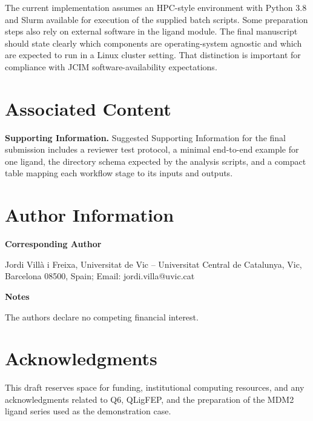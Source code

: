 \documentclass[journal=jcisd8,manuscript=article]{achemso}
\begin{document}
The current implementation assumes an HPC-style environment with Python 3.8 and Slurm available for execution of the supplied batch scripts. Some preparation steps also rely on external software in the ligand module. The final manuscript should state clearly which components are operating-system agnostic and which are expected to run in a Linux cluster setting. That distinction is important for compliance with JCIM software-availability expectations.

\section{Associated Content}

\textbf{Supporting Information.} Suggested Supporting Information for the final submission includes a reviewer test protocol, a minimal end-to-end example for one ligand, the directory schema expected by the analysis scripts, and a compact table mapping each workflow stage to its inputs and outputs.

\section{Author Information}

\textbf{Corresponding Author}

Jordi Vill\`a i Freixa, Universitat de Vic -- Universitat Central de Catalunya, Vic, Barcelona 08500, Spain; Email: jordi.villa@uvic.cat

\textbf{Notes}

The authors declare no competing financial interest.

\section{Acknowledgments}

This draft reserves space for funding, institutional computing resources, and any acknowledgments related to Q6, QLigFEP, and the preparation of the MDM2 ligand series used as the demonstration case.


\end{document}
